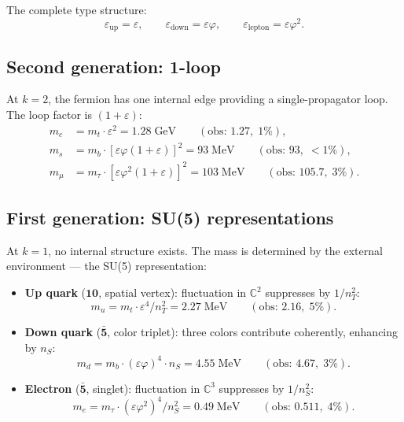 The complete type structure:
\begin{equation}
\varepsilon_\text{up} = \varepsilon, \qquad \varepsilon_\text{down} = \varepsilon\varphi, \qquad \varepsilon_\text{lepton} = \varepsilon\varphi^2.
\end{equation}

\subsection{Second generation: 1-loop}

At $k = 2$, the fermion has one internal edge providing a single-propagator loop. The loop factor is $(1 + \varepsilon)$:
\begin{align}
m_c &= m_t \cdot \varepsilon^2 = 1.28\;\text{GeV} \qquad (\text{obs: } 1.27,\; 1\%), \\
m_s &= m_b \cdot [\varepsilon\varphi(1+\varepsilon)]^2 = 93\;\text{MeV} \qquad (\text{obs: } 93,\; <1\%), \\
m_\mu &= m_\tau \cdot [\varepsilon\varphi^2(1+\varepsilon)]^2 = 103\;\text{MeV} \qquad (\text{obs: } 105.7,\; 3\%).
\end{align}

\subsection{First generation: SU(5) representations}

At $k = 1$, no internal structure exists. The mass is determined by the external environment --- the SU(5) representation:

\begin{itemize}
\item \textbf{Up quark} ($\mathbf{10}$, spatial vertex): fluctuation in $\mathbb{C}^2$ suppresses by $1/n_T^2$:
\begin{equation}
m_u = m_t \cdot \varepsilon^4 / n_T^2 = 2.27\;\text{MeV} \qquad (\text{obs: } 2.16,\; 5\%).
\end{equation}

\item \textbf{Down quark} ($\bar{\mathbf{5}}$, color triplet): three colors contribute coherently, enhancing by $n_S$:
\begin{equation}
m_d = m_b \cdot (\varepsilon\varphi)^4 \cdot n_S = 4.55\;\text{MeV} \qquad (\text{obs: } 4.67,\; 3\%).
\end{equation}

\item \textbf{Electron} ($\bar{\mathbf{5}}$, singlet): fluctuation in $\mathbb{C}^3$ suppresses by $1/n_S^2$:
\begin{equation}
m_e = m_\tau \cdot (\varepsilon\varphi^2)^4 / n_S^2 = 0.49\;\text{MeV} \qquad (\text{obs: } 0.511,\; 4\%).
\end{equation}
\end{itemize}

